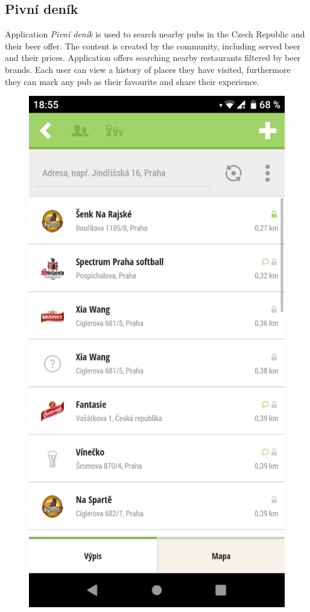 \subsection{Pivní deník}
Application \textit{Pivní deník} is used to search nearby pubs in the Czech Republic and their beer offer. The content is created by the community, including served beer and their prices.  Application offers searching nearby restaurants filtered by beer brands. Each user can view a history of places they have visited, furthermore they can mark any pub as their favourite and share their experience.


\begin{figure}[ht]
    \centering
    \begin{minipage}{0.45\linewidth}
        \centering
        \includegraphics[width=0.75\linewidth]{img/analysis/pivni_denik.png}

\end{minipage}
\end{figure}
